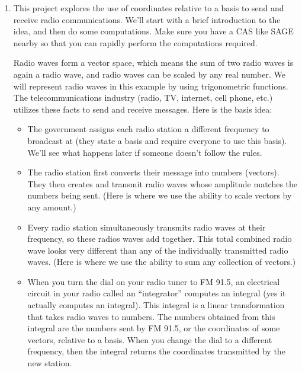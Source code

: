 \begin{enumerate}
\item This project explores the use of coordinates relative to a basis to send and receive radio communications.  We'll start with a brief introduction to the idea, and then do some computations. Make sure you have a CAS like SAGE nearby so that you can rapidly perform the computations required.

Radio waves form a vector space, which means the sum of two radio waves is again a radio wave, and radio waves can be scaled by any real number. We will represent radio waves in this example by using trigonometric functions. The telecommunications industry (radio, TV, internet, cell phone, etc.) utilizes these facts to send and receive messages.  Here is the basis idea:
\begin{itemize}
	\item The government assigns each radio station a different frequency to broadcast at (they state a basis and require everyone to use this basis). We'll see what happens later if someone doesn't follow the rules. 
	\item The radio station first converts their message into numbers (vectors). They then creates and transmit radio waves whose amplitude matches the numbers being sent. (Here is where we use the ability to scale vectors by any amount.)
	\item Every radio station simultaneously transmits radio waves at their frequency, so these radios waves add together. This total combined radio wave looks very different than any of the individually transmitted radio waves. (Here is where we use the ability to sum any collection of vectors.)
	\item When you turn the dial on your radio tuner to FM 91.5, an electrical circuit in your radio called an ``integrator'' computes an integral (yes it actually computes an integral). This integral is a linear transformation that takes radio waves to numbers. The numbers obtained from this integral are the numbers sent by FM 91.5, or the coordinates of some vectors, relative to a basis.  
	When you change the dial to a different frequency, then the integral returns the coordinates transmitted by the new station.	
\end{itemize}


\end{enumerate}
